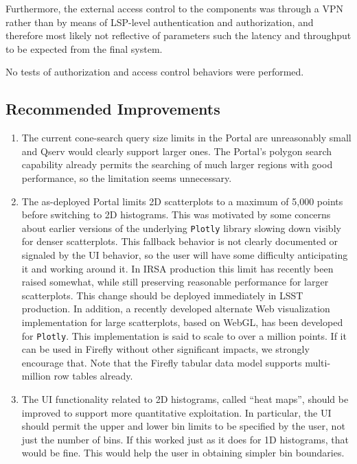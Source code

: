 \documentclass[DM,lsstdraft,STR,toc]{lsstdoc}
\begin{document}
Furthermore, the external access control to the components was through a VPN rather than by means of LSP-level authentication and authorization,
and therefore most likely not reflective of parameters such the latency and throughput to be expected from the final system.

No tests of authorization and access control behaviors were performed.


\subsection{Recommended Improvements}
\label{sect:recommendations}

\begin{enumerate}

\item{The current cone-search query size limits in the Portal are unreasonably small and Qserv would clearly support larger ones.
The Portal's polygon search capability already permits the searching of much larger regions with good performance,
so the limitation seems unnecessary.}
\item{The as-deployed Portal limits 2D scatterplots to a maximum of 5,000 points before switching to 2D histograms.
This was motivated by some concerns about earlier versions of the underlying \verb|Plotly| library slowing down visibly for denser scatterplots.
This fallback behavior is not clearly documented or signaled by the UI behavior,
so the user will have some difficulty anticipating it and working around it.
In IRSA production this limit has recently been raised somewhat, while still preserving reasonable performance for larger scatterplots.
This change should be deployed immediately in LSST production.
In addition, a recently developed alternate Web visualization implementation for large scatterplots, based on WebGL, has been developed for \verb|Plotly|.
This implementation is said to scale to over a million points.
If it can be used in Firefly without other significant impacts, we strongly encourage that.
Note that the Firefly tabular data model supports multi-million row tables already.}
\item{The UI functionality related to 2D histograms, called ``heat maps'', should be improved to support more quantitative exploitation.
In particular, the UI should permit the upper and lower bin limits to be specified by the user, not just the number of bins.
If this worked just as it does for 1D histograms, that would be fine.
This would help the user in obtaining simpler bin boundaries.
}
\end{enumerate}
\end{document}
